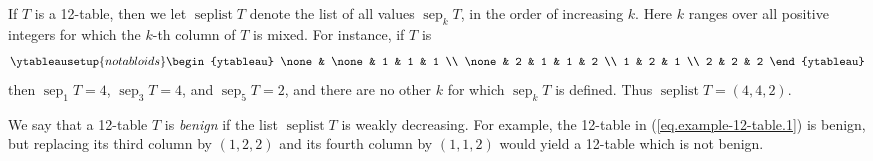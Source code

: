\documentclass[numbers=enddot,12pt,final,onecolumn,notitlepage]{scrartcl}%
\theoremstyle{definition}
\begin{document}
If $T$ is a 12-table, then we let $\operatorname*{seplist}T$ denote the list
of all values $\operatorname*{sep}\nolimits_{k}T$, in the order of increasing
$k$. Here $k$ ranges over all positive integers for which the $k$-th column
of $T$ is mixed. For instance, if $T$ is
\[
%
\ytableausetup{notabloids}
\begin{ytableau}
\none& \none& 1 & 1 & 1 \\
\none& 2 & 1 & 1 & 2 \\
1 & 2 & 1 \\
2 & 2 & 2
\end{ytableau}%
\]
then $\operatorname*{sep}\nolimits_{1}T=4$, $\operatorname*{sep}\nolimits_{3}T=4$, and
$\operatorname*{sep}\nolimits_{5}T=2$, and there are no other $k$ for which $\operatorname*{sep}\nolimits_{k}T$ is defined. Thus $\operatorname*{seplist}T=\left(  4,4,2\right)  $.

We say that a 12-table $T$ is \textit{benign} if the list
$\operatorname*{seplist}T$ is weakly decreasing. For
example, the 12-table in (\ref{eq.example-12-table.1}) is benign,
but replacing its third column by $\left(1,2,2\right)$ and its
fourth column by $\left(1,1,2\right)$ would yield a 12-table
which is not benign.
\end{document}
